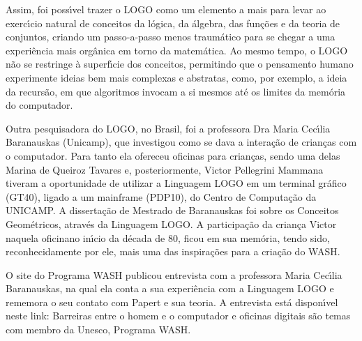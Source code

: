 \documentclass[
12pt,		%
openright,	%
twoside,  %
a4paper,			%
chapter=TITLE,		%
english,			%
french,				%
spanish,			%
brazil				%
]{USPSC-classe/USPSC}
\begin{document}
Assim, foi poss\'{\i}vel trazer o LOGO como um elemento a mais para levar ao exerc\'{\i}cio natural de conceitos da l\'ogica, da \'algebra, das fun\c{c}\~oes e da teoria de conjuntos, criando um passo-a-passo menos traum\'atico para se chegar a uma experi\^encia mais org\^anica em torno da matem\'atica. Ao mesmo tempo, o LOGO n\~ao se restringe \`a superf\'{\i}cie dos conceitos, permitindo que o pensamento humano experimente ideias bem mais complexas e abstratas, como, por exemplo, a ideia da recurs\~ao, em que algoritmos invocam a si mesmos at\'e os limites da mem\'oria do computador.









Outra pesquisadora do LOGO, no Brasil, foi a professora  Dra Maria Cec\'{\i}lia Baranauskas (Unicamp), que investigou como  se dava a intera\c{c}\~ao de crian\c{c}as com o computador. Para tanto ela ofereceu oficinas para  crian\c{c}as, sendo uma delas Marina de Queiroz Tavares  e, posteriormente, Victor Pellegrini Mammana  tiveram a oportunidade  de  utilizar a Linguagem LOGO em um terminal gr\'afico (GT40), ligado a um mainframe (PDP10), do Centro de Computa\c{c}\~ao da UNICAMP. A disserta\c{c}\~ao de Mestrado de Baranauskas foi sobre os \textquotedbl Conceitos Geom\'etricos, atrav\'es da Linguagem LOGO\textquotedbl . A participa\c{c}\~ao da crian\c{c}a Victor naquela \textquotedbl oficina\textquotedbl  no in\'{\i}cio da d\'ecada de 80, ficou em sua mem\'oria, tendo sido, reconhecidamente por ele, mais uma das inspira\c{c}\~oes para a cria\c{c}\~ao do WASH.









O site do Programa WASH publicou entrevista com a professora Maria Cec\'{\i}lia Baranauskas, na qual ela conta a sua experi\^encia com a Linguagem LOGO e rememora o seu contato com Papert e sua teoria. A entrevista est\'a dispon\'{\i}vel neste link: \textquotedbl Barreiras entre o homem e o computador e oficinas digitais s\~ao temas com membro da Unesco, Programa WASH\textquotedbl .
\end{document}
